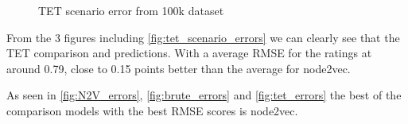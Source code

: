 \begin{figure}[H]
	\centering
	\begin{adjustbox}{width=0.5\textwidth}
		
	\end{adjustbox}
	\caption{TET scenario error from 100k dataset}
	\label{fig:tet_scenario_errors}
\end{figure}

From the $3$ figures including \autoref{fig:tet_scenario_errors} we can clearly see that the TET comparison and predictions.
With a average RMSE for the ratings at around 0.79, close to 0.15 points better than the average for node2vec.

As seen in \autoref{fig:N2V_errors}, \ref{fig:brute_errors} and \ref{fig:tet_errors} the best of the comparison models with the best RMSE scores is node2vec. 

